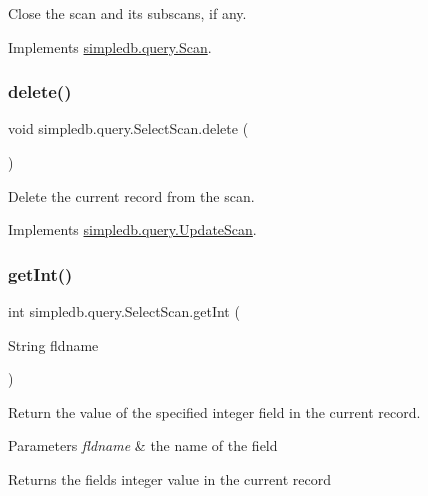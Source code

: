 Close the scan and its subscans, if any. 

Implements \hyperlink{interfacesimpledb_1_1query_1_1Scan_a260f40a8c82edaa00398bea9d698933c}{simpledb.\+query.\+Scan}.

\mbox{\label{classsimpledb_1_1query_1_1SelectScan_a698afd872a1362c6d20e59396adf64bb}} 
\subsubsection{\texorpdfstring{delete()}{delete()}}
{\footnotesize\ttfamily void simpledb.\+query.\+Select\+Scan.\+delete (\begin{DoxyParamCaption}{ }\end{DoxyParamCaption})\hspace{0.3cm}{\ttfamily [inline]}}

Delete the current record from the scan. 

Implements \hyperlink{interfacesimpledb_1_1query_1_1UpdateScan_a503723e6287a2ea9ce73375f70a5e819}{simpledb.\+query.\+Update\+Scan}.

\mbox{\label{classsimpledb_1_1query_1_1SelectScan_af1af0f56c8c9afcc128cc2be6f4f4670}} 
\subsubsection{\texorpdfstring{get\+Int()}{getInt()}}
{\footnotesize\ttfamily int simpledb.\+query.\+Select\+Scan.\+get\+Int (\begin{DoxyParamCaption}\item[{String}]{fldname }\end{DoxyParamCaption})\hspace{0.3cm}{\ttfamily [inline]}}

Return the value of the specified integer field in the current record. 
\begin{DoxyParams}{Parameters}
{\em fldname} & the name of the field \\
\hline
\end{DoxyParams}
\begin{DoxyReturn}{Returns}
the field\textquotesingle{}s integer value in the current record 
\end{DoxyReturn}


